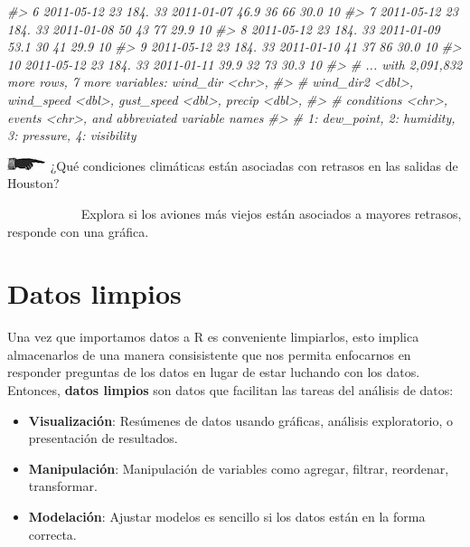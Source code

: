 \documentclass[
]{book}
\newenvironment{Shaded}{\begin{snugshade}}{\end{snugshade}}
\newcommand{\CommentTok}[1]{\textcolor[rgb]{0.56,0.35,0.01}{\textit{#1}}}
\begin{document}
\begin{Shaded}
\begin{Highlighting}[]
\CommentTok{\#\textgreater{}  6 2011{-}05{-}12    23  184.    33 2011{-}01{-}07  46.9    36        66    30.0      10}
\CommentTok{\#\textgreater{}  7 2011{-}05{-}12    23  184.    33 2011{-}01{-}08  50      43        77    29.9      10}
\CommentTok{\#\textgreater{}  8 2011{-}05{-}12    23  184.    33 2011{-}01{-}09  53.1    30        41    29.9      10}
\CommentTok{\#\textgreater{}  9 2011{-}05{-}12    23  184.    33 2011{-}01{-}10  41      37        86    30.0      10}
\CommentTok{\#\textgreater{} 10 2011{-}05{-}12    23  184.    33 2011{-}01{-}11  39.9    32        73    30.3      10}
\CommentTok{\#\textgreater{} \# ... with 2,091,832 more rows, 7 more variables: wind\_dir \textless{}chr\textgreater{},}
\CommentTok{\#\textgreater{} \#   wind\_dir2 \textless{}dbl\textgreater{}, wind\_speed \textless{}dbl\textgreater{}, gust\_speed \textless{}dbl\textgreater{}, precip \textless{}dbl\textgreater{},}
\CommentTok{\#\textgreater{} \#   conditions \textless{}chr\textgreater{}, events \textless{}chr\textgreater{}, and abbreviated variable names}
\CommentTok{\#\textgreater{} \#   1: dew\_point, 2: humidity, 3: pressure, 4: visibility}
\end{Highlighting}
\end{Shaded}

\includegraphics{imagenes/manicule2.jpg} ¿Qué condiciones climáticas están asociadas
con retrasos en las salidas de Houston?

~~~~~~~~~~~ Explora
si los aviones más viejos están asociados a mayores retrasos, responde
con una gráfica.

\hypertarget{datos-limpios}{%
\section{Datos limpios}\label{datos-limpios}}

Una vez que importamos datos a R es conveniente limpiarlos, esto implica
almacenarlos de una manera consisistente que nos permita
enfocarnos en responder preguntas de los datos en lugar de estar luchando
con los datos. Entonces, \textbf{datos limpios} son datos que facilitan las tareas
del análisis de datos:

\begin{itemize}
\item
  \textbf{Visualización}: Resúmenes de datos usando gráficas, análisis exploratorio,
  o presentación de resultados.
\item
  \textbf{Manipulación}: Manipulación de variables como agregar, filtrar, reordenar,
  transformar.
\item
  \textbf{Modelación}: Ajustar modelos es sencillo si los datos están en la forma
  correcta.
\end{itemize}
\end{document}
